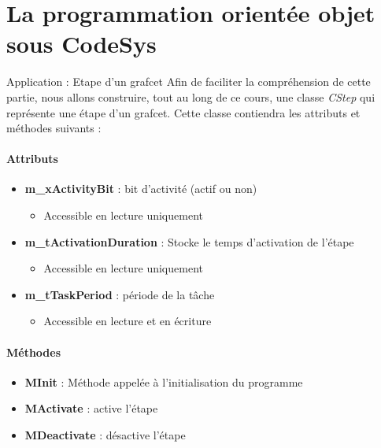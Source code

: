 \section{La programmation orientée objet sous CodeSys}
\begin{UPSTIidee}{Application : Etape d'un grafcet}
    Afin de faciliter la compréhension de cette partie, nous allons construire, tout au long de ce cours, une classe \emph{CStep} qui représente une étape d'un grafcet. Cette classe contiendra les attributs et méthodes suivants :

    \begin{minipage}{.45\linewidth}
        \paragraph{Attributs}
        \begin{itemize}
            \item \textbf{m\_xActivityBit} : bit d'activité (actif ou non)
                  \begin{itemize}
                      \item Accessible en lecture uniquement
                  \end{itemize}
            \item \textbf{m\_tActivationDuration} : Stocke le temps d'activation de l'étape
                  \begin{itemize}
                      \item Accessible en lecture uniquement
                  \end{itemize}
            \item \textbf{m\_tTaskPeriod} : période de la tâche
                  \begin{itemize}
                      \item Accessible en lecture et en écriture
                  \end{itemize}
        \end{itemize}
    \end{minipage}%
    \begin{minipage}{.45\linewidth}
        \paragraph{Méthodes}
        \begin{itemize}
            \item \textbf{MInit} : Méthode appelée à l'initialisation du programme
            \item \textbf{MActivate} : active l'étape
            \item \textbf{MDeactivate} : désactive l'étape
        \end{itemize}
    \end{minipage}

\end{UPSTIidee}
















